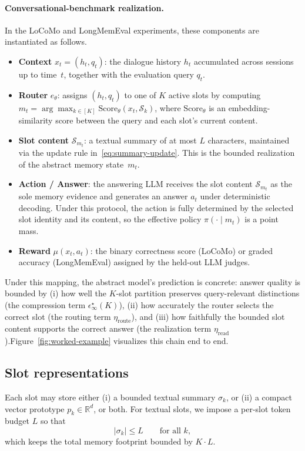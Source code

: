 \documentclass{article}
\theoremstyle{plain}
\theoremstyle{definition}
\theoremstyle{remark}
\newcommand{\eps}{\epsilon}
\begin{document}
\paragraph{Conversational-benchmark realization.}
In the LoCoMo and LongMemEval experiments, these components are instantiated as follows.
\begin{itemize}[leftmargin=2em,itemsep=2pt]
    \item \textbf{Context} $x_t = (h_t, q_t)$: the dialogue history $h_t$ accumulated across sessions up to time~$t$, together with the evaluation query $q_t$.
    \item \textbf{Router} $e_\theta$: assigns $(h_t, q_t)$ to one of $K$ active slots by computing $m_t = \arg\max_{k\in[K]} \mathrm{Score}_\theta(x_t, \mathcal{S}_k)$, where $\mathrm{Score}_\theta$ is an embedding-similarity score between the query and each slot's current content.
    \item \textbf{Slot content} $\mathcal{S}_{m_t}$: a textual summary of at most $L$ characters, maintained via the update rule in~\eqref{eq:summary-update}. This is the bounded realization of the abstract memory state~$m_t$.
    \item \textbf{Action / Answer}: the answering LLM receives the slot content $\mathcal{S}_{m_t}$ as the sole memory evidence and generates an answer $a_t$ under deterministic decoding. Under this protocol, the action is fully determined by the selected slot identity and its content, so the effective policy $\pi(\cdot\mid m_t)$ is a point mass.
    \item \textbf{Reward} $\mu(x_t, a_t)$: the binary correctness score (LoCoMo) or graded accuracy (LongMemEval) assigned by the held-out LLM judges.
\end{itemize}
Under this mapping, the abstract model's prediction is concrete: answer quality is bounded by (i) how well the $K$-slot partition preserves query-relevant distinctions (the compression term $\eps^\star_\infty(K)$), (ii) how accurately the router selects the correct slot (the routing term $\eta_{\mathrm{route}}$), and (iii) how faithfully the bounded slot content supports the correct answer (the realization term $\eta_{\mathrm{read}}$).Figure~\ref{fig:worked-example} visualizes this chain end to
end.
\subsection{Slot representations}
Each slot may store either
(i) a bounded textual summary $\sigma_k$, or
(ii) a compact vector prototype $p_k\in\mathbb R^d$, or both.
For textual slots, we impose a per-slot token budget $L$ so that
\[
|\sigma_k|\le L
\qquad
\text{for all }k,
\]
which keeps the total memory footprint bounded by $K\cdot L$.
\end{document}

